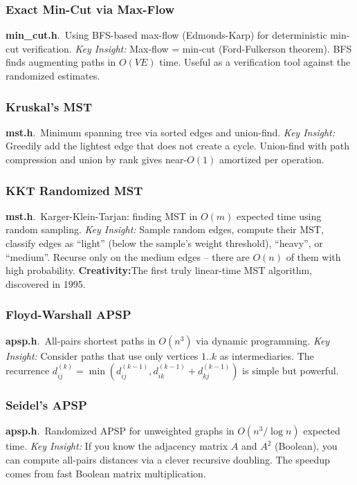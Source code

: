 \documentclass[11pt,a4paper]{article}
\newcommand{\algo}[2]{\textbf{#1}.\ #2}
\newcommand{\insight}{\textit{Key Insight: }}
\newcommand{\creative}{\textcolor{orange!80!black}{\textbf{Creativity:}}}
\begin{document}
\subsubsection{Exact Min-Cut via Max-Flow}
\algo{min\_cut.h}{Using BFS-based max-flow (Edmonds-Karp) for deterministic min-cut verification.}
\insight Max-flow = min-cut (Ford-Fulkerson theorem). BFS finds augmenting paths in \(O(VE)\) time. Useful as a verification tool against the randomized estimates.

\subsubsection{Kruskal's MST}
\algo{mst.h}{Minimum spanning tree via sorted edges and union-find.}
\insight Greedily add the lightest edge that does not create a cycle. Union-find with path compression and union by rank gives near-\(O(1)\) amortized per operation.

\subsubsection{KKT Randomized MST}
\algo{mst.h}{Karger-Klein-Tarjan: finding MST in \(O(m)\) expected time using random sampling.}
\insight Sample random edges, compute their MST, classify edges as ``light'' (below the sample's weight threshold), ``heavy'', or ``medium''. Recurse only on the medium edges -- there are \(O(n)\) of them with high probability.
\creative The first truly linear-time MST algorithm, discovered in 1995.

\subsubsection{Floyd-Warshall APSP}
\algo{apsp.h}{All-pairs shortest paths in \(O(n^3)\) via dynamic programming.}
\insight Consider paths that use only vertices \(1..k\) as intermediaries. The recurrence \(d_{ij}^{(k)} = \min(d_{ij}^{(k-1)}, d_{ik}^{(k-1)} + d_{kj}^{(k-1)})\) is simple but powerful.

\subsubsection{Seidel's APSP}
\algo{apsp.h}{Randomized APSP for unweighted graphs in \(O(n^3 / \log n)\) expected time.}
\insight If you know the adjacency matrix \(A\) and \(A^2\) (Boolean), you can compute all-pairs distances via a clever recursive doubling. The speedup comes from fast Boolean matrix multiplication.
\end{document}

